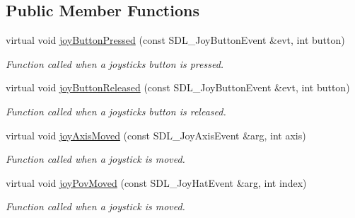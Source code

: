 \subsection*{Public Member Functions}
\begin{DoxyCompactItemize}
\item 
\mbox{\label{class_common_1_1_joystick_listener_a0b1d0c64903a2ac2e5c5f7f8bfb7ce81}} 
virtual void \hyperlink{class_common_1_1_joystick_listener_a0b1d0c64903a2ac2e5c5f7f8bfb7ce81}{joy\+Button\+Pressed} (const S\+D\+L\+\_\+\+Joy\+Button\+Event \&evt, int button)
\begin{DoxyCompactList}\small\item\em Function called when a joystick\textquotesingle{}s button is pressed. \end{DoxyCompactList}\item 
\mbox{\label{class_common_1_1_joystick_listener_a9ed8cc90e3644cdbd00355acba3cb1e5}} 
virtual void \hyperlink{class_common_1_1_joystick_listener_a9ed8cc90e3644cdbd00355acba3cb1e5}{joy\+Button\+Released} (const S\+D\+L\+\_\+\+Joy\+Button\+Event \&evt, int button)
\begin{DoxyCompactList}\small\item\em Function called when a joystick\textquotesingle{}s button is released. \end{DoxyCompactList}\item 
\mbox{\label{class_common_1_1_joystick_listener_ad8cc8de4cab46d53f99c496247ec381e}} 
virtual void \hyperlink{class_common_1_1_joystick_listener_ad8cc8de4cab46d53f99c496247ec381e}{joy\+Axis\+Moved} (const S\+D\+L\+\_\+\+Joy\+Axis\+Event \&arg, int axis)
\begin{DoxyCompactList}\small\item\em Function called when a joystick is moved. \end{DoxyCompactList}\item 
\mbox{\label{class_common_1_1_joystick_listener_ac18be87a19beedcd9b93b38849575062}} 
virtual void \hyperlink{class_common_1_1_joystick_listener_ac18be87a19beedcd9b93b38849575062}{joy\+Pov\+Moved} (const S\+D\+L\+\_\+\+Joy\+Hat\+Event \&arg, int index)
\begin{DoxyCompactList}\small\item\em Function called when a joystick is moved. \end{DoxyCompactList}\end{DoxyCompactItemize}


